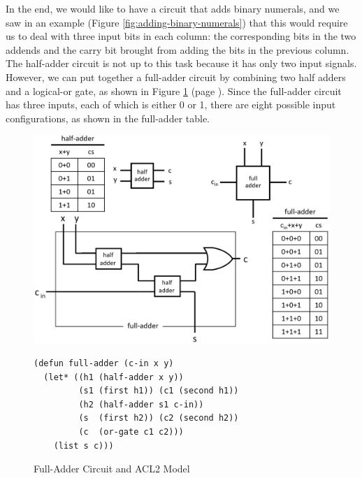 In the end, we would like to have a circuit
that adds binary numerals,
and we saw in an example (Figure \ref{fig:adding-binary-numerals})
that this would require us to deal with three input bits
in each column:
the corresponding bits in the two addends
and the carry bit brought from adding 
the bits in the previous column.
The half-adder circuit is not up to this task 
because it has only two input signals.
However, we can put together a full-adder circuit
by combining two half adders and a logical-or gate,
as shown in Figure \ref{fig:full-adder}
(page \pageref{fig:full-adder}).
Since the full-adder circuit has three inputs,
each of which is either 0 or 1,
there are eight possible input configurations,
as shown in the full-adder table.

\begin{figure}
\begin{center}
\includegraphics[scale=0.25]{Images/full-adder.png}
\begin{Verbatim}
(defun full-adder (c-in x y)
  (let* ((h1 (half-adder x y))
         (s1 (first h1)) (c1 (second h1))
         (h2 (half-adder s1 c-in))
         (s  (first h2)) (c2 (second h2))
         (c  (or-gate c1 c2)))
    (list s c)))
\end{Verbatim}
\end{center}
\caption{Full-Adder Circuit and ACL2 Model}
\label{fig:full-adder}
\end{figure}


